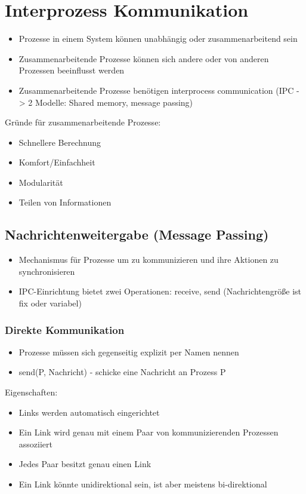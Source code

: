 \documentclass[a4paper]{scrreprt}
\begin{document}
\section{Interprozess Kommunikation}
	\begin{itemize}
		\item Prozesse in einem System können unabhängig oder zusammenarbeitend sein
		\item Zusammenarbeitende Prozesse können sich andere oder von anderen Prozessen beeinflusst werden
		\item Zusammenarbeitende Prozesse benötigen interprocess communication (IPC -> 2 Modelle: Shared memory, message passing)
	\end{itemize}
	Gründe für zusammenarbeitende Prozesse:
	\begin{itemize}
		\item Schnellere Berechnung
		\item Komfort/Einfachheit
		\item Modularität
		\item Teilen von Informationen
	\end{itemize}

\subsection{Nachrichtenweitergabe (Message Passing)}
	\begin{itemize}
		\item Mechanismus für Prozesse um zu kommunizieren und ihre Aktionen zu synchronisieren
		\item IPC-Einrichtung bietet zwei Operationen: receive, send (Nachrichtengröße ist fix oder variabel)
	\end{itemize}
\subsubsection {Direkte Kommunikation}
	\begin{itemize}
		\item Prozesse müssen sich gegenseitig explizit per Namen nennen
		\item send(P, Nachricht) - schicke eine Nachricht an Prozess P
	\end{itemize}
	Eigenschaften:
	\begin{itemize}
		\item Links werden automatisch eingerichtet
		\item Ein Link wird genau mit einem Paar von kommunizierenden Prozessen assoziiert
		\item Jedes Paar besitzt genau einen Link
		\item Ein Link könnte unidirektional sein, ist aber meistens bi-direktional
	\end{itemize}
	
\end{document}
